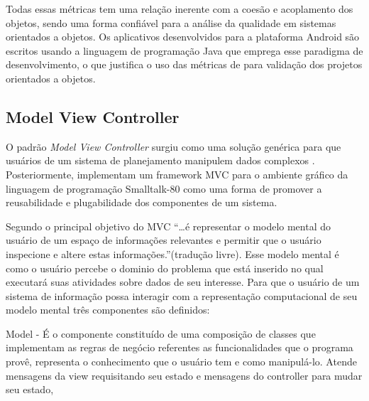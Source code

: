 \documentclass[conference]{IEEEtran}
\begin{document}
%	



Todas essas métricas tem uma relação inerente com a coesão e acoplamento dos
objetos, sendo uma forma confiável para a análise da qualidade em sistemas
orientados a objetos. Os aplicativos desenvolvidos para a plataforma Android são
escritos usando a linguagem de programação Java que emprega esse paradigma de
desenvolvimento, o que justifica o uso das métricas de \cite{cksuite} para
validação dos projetos orientados a objetos.

\subsection{Model View Controller}

O padrão \textit{Model View Controller} surgiu como uma solução genérica para
que usuários de um sistema de planejamento manipulem dados complexos
\cite{Reenskaug:1979}. Posteriormente, \cite{krasnerPope1988}
implementam um framework MVC para o ambiente gráfico da linguagem de programação
Smalltalk-80 como uma forma de promover a reusabilidade e plugabilidade dos
componentes de um sistema.

Segundo \cite{Reenskaug:1979} o principal objetivo do MVC
``\ldots é representar o modelo mental do usuário de um espaço de informações
relevantes e permitir que o usuário inspecione e altere estas
informações.''(tradução livre).
Esse modelo mental é como o usuário percebe o dominio do problema que está inserido no qual executará suas atividades sobre dados de seu interesse. Para que o usuário de um sistema de
informação possa interagir com a representação computacional  de seu modelo
mental três componentes são definidos:

Model - É o componente constituído de uma composição de classes que implementam
as regras de negócio referentes as funcionalidades que o programa provê,
representa o  conhecimento que o usuário tem e como manipulá-lo. Atende
mensagens da view requisitando seu estado e mensagens do controller para mudar
seu estado,
\end{document}
